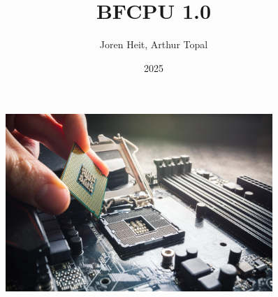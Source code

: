 \documentclass{article}
\title{BFCPU 1.0}
\author{Joren Heit, Arthur Topal}
\date{2025}
\begin{document}
\maketitle
\thispagestyle{empty}

\begin{figure}[H]
  \centering
  \includegraphics[width=0.9\textwidth]{img/_processor}
\end{figure}

\newpage
\tableofcontents









\end{document}
